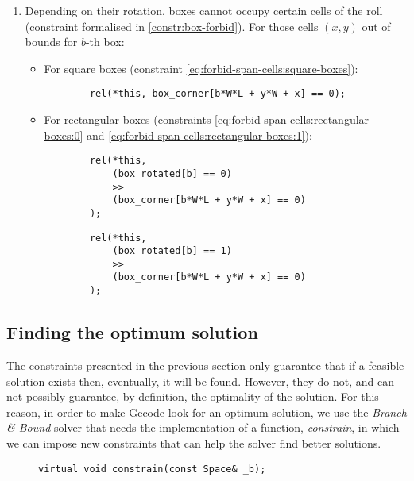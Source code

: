 \begin{enumerate}
    \item Depending on their rotation, boxes cannot occupy certain cells of the
    roll (constraint formalised in \ref{constr:box-forbid}). For those cells $(x,y)$
    out of bounds for $b$-th box:
    
    \begin{itemize}
		\item For square boxes (constraint \ref{eq:forbid-span-cells:square-boxes}):
		{\NOINDENT \begin{lstlisting}
		rel(*this, box_corner[b*W*L + y*W + x] == 0);
		\end{lstlisting}}
		
		\item For rectangular boxes (constraints \ref{eq:forbid-span-cells:rectangular-boxes:0}
		and \ref{eq:forbid-span-cells:rectangular-boxes:1}):
		{\NOINDENT \begin{lstlisting}
		rel(*this,
			(box_rotated[b] == 0)
			>>
			(box_corner[b*W*L + y*W + x] == 0)
		);
		\end{lstlisting}}
		{\NOINDENT \begin{lstlisting}
		rel(*this,
			(box_rotated[b] == 1)
			>>
			(box_corner[b*W*L + y*W + x] == 0)
		);
		\end{lstlisting}}
	\end{itemize}
    
\end{enumerate}

\subsection{Finding the optimum solution}
\label{sec:constraint-programming:optimum}

The constraints presented in the previous section only guarantee that if a
feasible solution exists then, eventually, it will be found. However, they
do not, and can not possibly guarantee, by definition, the optimality of the
solution. For this reason, in order to make Gecode look for an optimum solution,
we use the \textit{Branch \& Bound} solver that needs the implementation of
a function, \textit{constrain}, in which we can impose new constraints that
can help the solver find better solutions.

\begin{figure}[H]
	\centering
	{\NOINDENT \begin{lstlisting}[xleftmargin=.24\textwidth]
	virtual void constrain(const Space& _b);
	\end{lstlisting}}
	\label{fig:constrain-header}
\end{figure}

